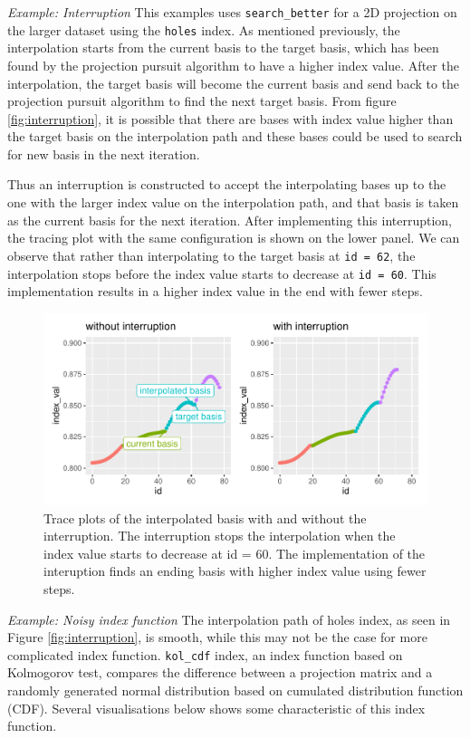 \documentclass[12pt]{article}
\begin{document}
\emph{Example: Interruption} This examples uses \texttt{search\_better}
for a 2D projection on the larger dataset using the \texttt{holes}
index. As mentioned previously, the interpolation starts from the
current basis to the target basis, which has been found by the
projection pursuit algorithm to have a higher index value. After the
interpolation, the target basis will become the current basis and send
back to the projection pursuit algorithm to find the next target basis.
From figure \ref{fig:interruption}, it is possible that there are bases
with index value higher than the target basis on the interpolation path
and these bases could be used to search for new basis in the next
iteration.

Thus an interruption is constructed to accept the interpolating bases up
to the one with the larger index value on the interpolation path, and
that basis is taken as the current basis for the next iteration. After
implementing this interruption, the tracing plot with the same
configuration is shown on the lower panel. We can observe that rather
than interpolating to the target basis at \texttt{id\ =\ 62}, the
interpolation stops before the index value starts to decrease at
\texttt{id\ =\ 60}. This implementation results in a higher index value
in the end with fewer steps.

\begin{figure}
\centering
\includegraphics{paper_files/figure-latex/interruption-1.pdf}
\caption{\label{interruption}Trace plots of the interpolated basis with
and without the interruption. The interruption stops the interpolation
when the index value starts to decrease at id = 60. The implementation
of the interuption finds an ending basis with higher index value using
fewer steps.}
\end{figure}

\emph{Example: Noisy index function} The interpolation path of holes
index, as seen in Figure \ref{fig:interruption}, is smooth, while this
may not be the case for more complicated index function.
\texttt{kol\_cdf} index, an index function based on Kolmogorov test,
compares the difference between a projection matrix and a randomly
generated normal distribution based on cumulated distribution function
(CDF). Several visualisations below shows some characteristic of this
index function.
\end{document}
